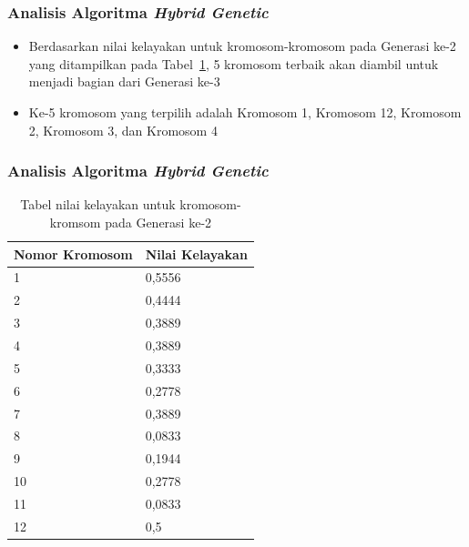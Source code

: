 \documentclass{beamer}
\begin{document}
\begin{frame}
\frametitle{Analisis Algoritma \textit{Hybrid Genetic}}
\begin{itemize}
\item Berdasarkan nilai kelayakan untuk kromosom-kromosom pada Generasi ke-2 yang ditampilkan pada Tabel~\ref{tab:analisishg3}, 5 kromosom terbaik akan diambil untuk menjadi bagian dari Generasi ke-3
\item Ke-5 kromosom yang terpilih adalah Kromosom 1, Kromosom 12, Kromosom 2, Kromosom 3, dan Kromosom 4
\end{itemize}
\end{frame}


\begin{frame}
\frametitle{Analisis Algoritma \textit{Hybrid Genetic}}
\begin{table}
\centering
\captionsetup{justification=centering}
\begin{tabular}{| l | l |}
\hline
Nomor Kromosom & Nilai Kelayakan \\
\hline \hline
1 & 0,5556 \\
\hline
2 & 0,4444 \\
\hline
3 & 0,3889 \\
\hline
4 & 0,3889 \\
\hline
5 & 0,3333 \\
\hline
6 & 0,2778 \\
\hline
7 & 0,3889 \\
\hline
8 & 0,0833 \\
\hline
9 & 0,1944 \\
\hline
10 & 0,2778 \\
\hline
11 & 0,0833 \\
\hline
12 & 0,5 \\
\hline
\end{tabular}
\caption[Tabel nilai kelayakan untuk kromosom-kromsom pada Generasi ke-1]{Tabel nilai kelayakan untuk kromosom-kromsom pada Generasi ke-2}
\label{tab:analisishg3}
\end{table}
\end{frame}

\note{

}
\end{document}

